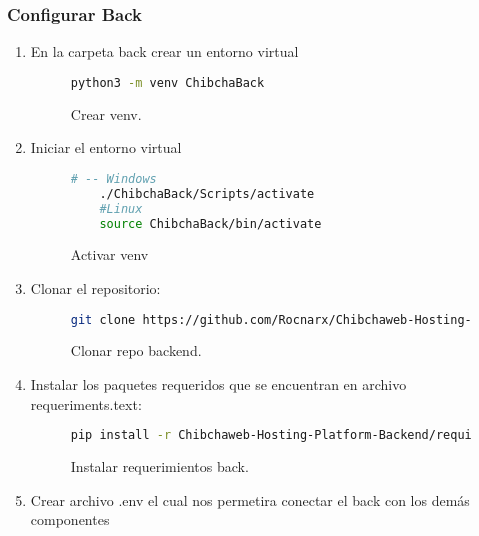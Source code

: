 \subsubsection*{Configurar Back}
\begin{enumerate}
    \item En la carpeta back crear un entorno virtual

    \begin{figure}
    \begin{lstlisting}[language=bash]
    python3 -m venv ChibchaBack
       \end{lstlisting}
       \caption{Crear venv.}
       \label{fig:crear-venv}
       \end{figure}
    \item Iniciar el entorno virtual


    \begin{figure}
    \begin{lstlisting}[language=bash]
    # -- Windows
    ./ChibchaBack/Scripts/activate
    #Linux
    source ChibchaBack/bin/activate
    \end{lstlisting}
    \caption{Activar venv}
    \label{fig:Activar-venv}
    \end{figure}

	\item Clonar el repositorio:

	\begin{figure}
	\begin{lstlisting}[language=bash]
    git clone https://github.com/Rocnarx/Chibchaweb-Hosting-Platform-Backend.git
    \end{lstlisting}
    \caption{Clonar repo backend.}
    \label{fig:Clonar-repo-backend}
    \end{figure}

    \item Instalar los paquetes requeridos que se encuentran en archivo requeriments.text:


    \begin{figure}
    \begin{lstlisting}[language=bash]
    pip install -r Chibchaweb-Hosting-Platform-Backend/requirements.txt
    \end{lstlisting}
    \caption{Instalar requerimientos back.}
    \label{fig:install-req}
    \end{figure}

    \item Crear archivo .env el cual nos permetira conectar el back con los demás componentes


\end{enumerate}
